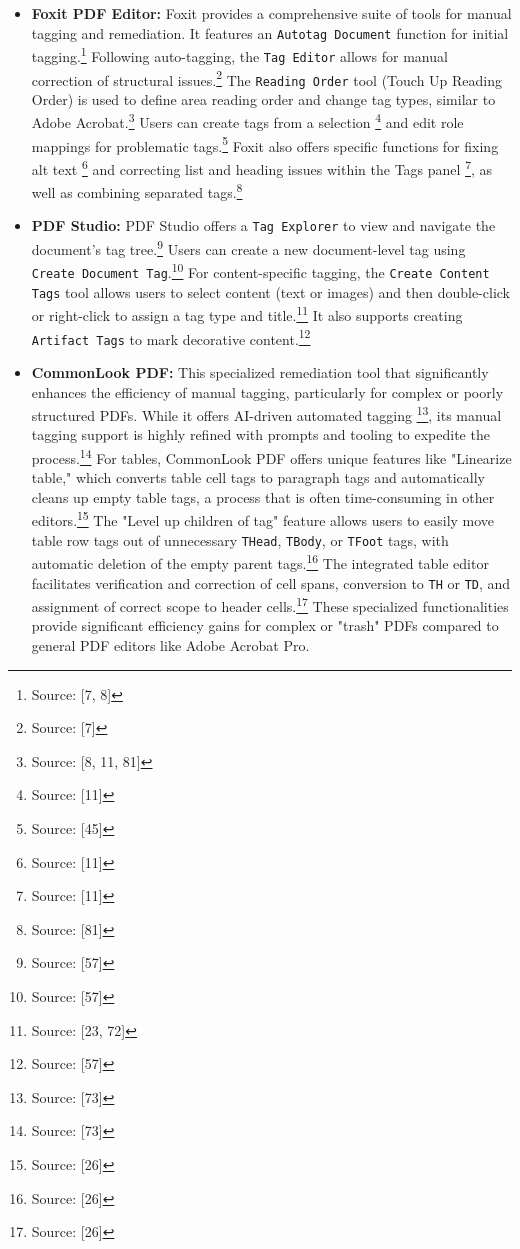 \begin{itemize}[noitemsep,topsep=0pt]
    \item \textbf{Foxit PDF Editor:} Foxit provides a comprehensive suite of tools for manual tagging and remediation. It features an \texttt{Autotag Document} function for initial tagging.\footnote{Source: [7, 8]} Following auto-tagging, the \texttt{Tag Editor} allows for manual correction of structural issues.\footnote{Source: [7]} The \texttt{Reading Order} tool (Touch Up Reading Order) is used to define area reading order and change tag types, similar to Adobe Acrobat.\footnote{Source: [8, 11, 81]} Users can create tags from a selection \footnote{Source: [11]} and edit role mappings for problematic tags.\footnote{Source: [45]} Foxit also offers specific functions for fixing alt text \footnote{Source: [11]} and correcting list and heading issues within the Tags panel \footnote{Source: [11]}, as well as combining separated tags.\footnote{Source: [81]}
    \item \textbf{PDF Studio:} PDF Studio offers a \texttt{Tag Explorer} to view and navigate the document's tag tree.\footnote{Source: [57]} Users can create a new document-level tag using \texttt{Create Document Tag}.\footnote{Source: [57]} For content-specific tagging, the \texttt{Create Content Tags} tool allows users to select content (text or images) and then double-click or right-click to assign a tag type and title.\footnote{Source: [23, 72]} It also supports creating \texttt{Artifact Tags} to mark decorative content.\footnote{Source: [57]}
    \item \textbf{CommonLook PDF:} This specialized remediation tool that significantly enhances the efficiency of manual tagging, particularly for complex or poorly structured PDFs. While it offers AI-driven automated tagging \footnote{Source: [73]}, its manual tagging support is highly refined with prompts and tooling to expedite the process.\footnote{Source: [73]} For tables, CommonLook PDF offers unique features like "Linearize table," which converts table cell tags to paragraph tags and automatically cleans up empty table tags, a process that is often time-consuming in other editors.\footnote{Source: [26]} The "Level up children of tag" feature allows users to easily move table row tags out of unnecessary \texttt{THead}, \texttt{TBody}, or \texttt{TFoot} tags, with automatic deletion of the empty parent tags.\footnote{Source: [26]} The integrated table editor facilitates verification and correction of cell spans, conversion to \texttt{TH} or \texttt{TD}, and assignment of correct scope to header cells.\footnote{Source: [26]} These specialized functionalities provide significant efficiency gains for complex or "trash" PDFs compared to general PDF editors like Adobe Acrobat Pro.
\end{itemize}

